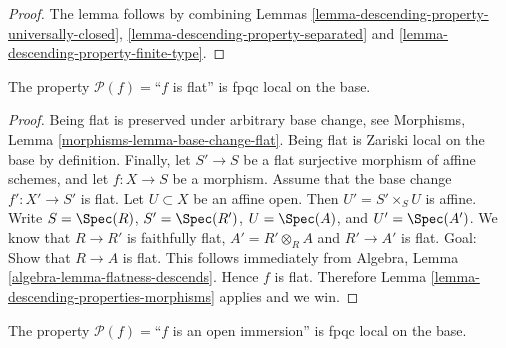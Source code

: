 \begin{proof}
The lemma follows by combining
Lemmas \ref{lemma-descending-property-universally-closed},
\ref{lemma-descending-property-separated}
and \ref{lemma-descending-property-finite-type}.
\end{proof}

\begin{lemma}
\label{lemma-descending-property-flat}
The property $\mathcal{P}(f) =$``$f$ is flat''
is fpqc local on the base.
\end{lemma}

\begin{proof}
Being flat is preserved under arbitrary base change, see
Morphisms, Lemma \ref{morphisms-lemma-base-change-flat}.
Being flat is Zariski local on the base by definition.
Finally, let
$S' \to S$ be a flat surjective morphism of affine schemes,
and let $f : X \to S$ be a morphism. Assume that the base change
$f' : X' \to S'$ is flat.
Let $U \subset X$ be an affine open. Then $U' = S' \times_S U$
is affine. Write
$S = \Spec(R)$,
$S' = \Spec(R')$,
$U = \Spec(A)$, and
$U' = \Spec(A')$.
We know that $R \to R'$ is faithfully flat,
$A' = R' \otimes_R A$ and $R' \to A'$ is flat.
Goal: Show that $R \to A$ is flat.
This follows immediately from
Algebra, Lemma \ref{algebra-lemma-flatness-descends}.
Hence $f$ is flat.
Therefore Lemma \ref{lemma-descending-properties-morphisms} applies and we win.
\end{proof}

\begin{lemma}
\label{lemma-descending-property-open-immersion}
The property $\mathcal{P}(f) =$``$f$ is an open immersion''
is fpqc local on the base.
\end{lemma}

